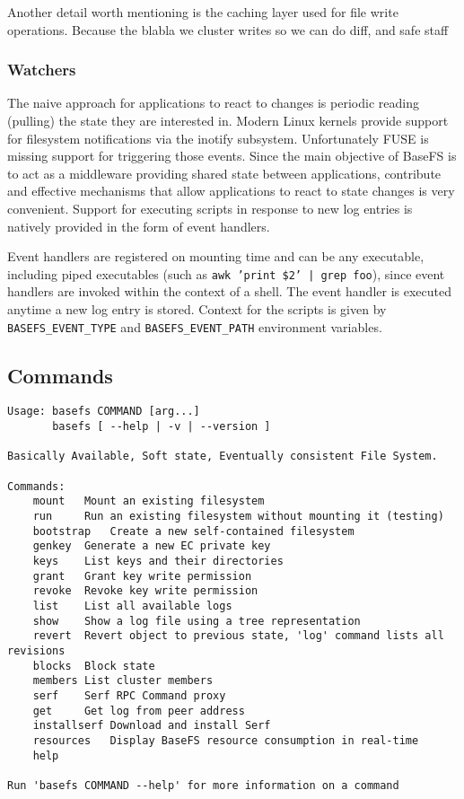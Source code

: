 \documentclass{sig-alternate}
\begin{document}
Another detail worth mentioning is the caching layer used for file write operations. Because the blabla we cluster writes so we can do diff, and safe staff

\subsubsection{Watchers}
The naive approach for applications to react to changes is periodic reading (pulling) the state they are interested in. Modern Linux kernels provide support for filesystem notifications via the inotify subsystem. Unfortunately FUSE is missing support for triggering those events. Since the main objective of BaseFS is to act as a middleware providing shared state between applications, contribute and effective mechanisms that allow applications to react to state changes is very convenient. Support for executing scripts in response to new log entries is natively provided in the form of event handlers.

Event handlers are registered on mounting time and can be any executable, including piped executables (such as \texttt{awk '{print \$2}' | grep foo}), since event handlers are invoked within the context of a shell. The event handler is executed anytime a new log entry is stored. Context for the scripts is given by \texttt{BASEFS\_EVENT\_TYPE} and \texttt{BASEFS\_EVENT\_PATH} environment variables. 


\subsection{Commands}

\begin{verbatim}
Usage: basefs COMMAND [arg...]
       basefs [ --help | -v | --version ]

Basically Available, Soft state, Eventually consistent File System.

Commands:
    mount	Mount an existing filesystem
    run		Run an existing filesystem without mounting it (testing)
    bootstrap	Create a new self-contained filesystem
    genkey	Generate a new EC private key
    keys	List keys and their directories
    grant	Grant key write permission
    revoke	Revoke key write permission
    list	List all available logs
    show	Show a log file using a tree representation
    revert	Revert object to previous state, 'log' command lists all revisions
    blocks	Block state
    members	List cluster members
    serf	Serf RPC Command proxy
    get		Get log from peer address
    installserf	Download and install Serf
    resources	Display BaseFS resource consumption in real-time
    help

Run 'basefs COMMAND --help' for more information on a command
\end{verbatim}
\end{document}
